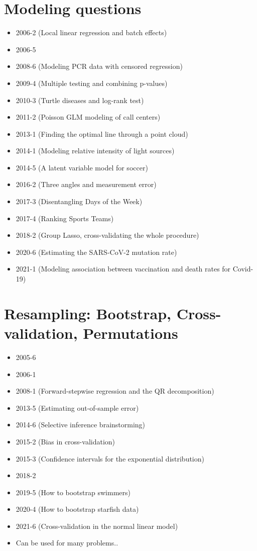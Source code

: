 \documentclass[12pt]{article}
\begin{document}
\section*{Modeling questions}
\begin{itemize}
\item 2006-2 (Local linear regression and batch effects)
\item 2006-5
\item 2008-6 (Modeling PCR data with censored regression)
\item 2009-4 (Multiple testing and combining p-values)
\item 2010-3 (Turtle diseases and log-rank test)
\item 2011-2 (Poisson GLM modeling of call centers)
\item 2013-1 (Finding the optimal line through a point cloud)
\item 2014-1 (Modeling relative intensity of light sources)
\item 2014-5 (A latent variable model for soccer)
\item 2016-2 (Three angles and measurement error)
\item 2017-3 (Disentangling Days of the Week)
\item 2017-4 (Ranking Sports Teams)
\item 2018-2 (Group Lasso, cross-validating the whole procedure)
\item 2020-6 (Estimating the SARS-CoV-2 mutation rate)
\item 2021-1 (Modeling association between vaccination and death rates for Covid-19)
\end{itemize}






\section*{Resampling: Bootstrap, Cross-validation, Permutations}
\begin{itemize}
\item 2005-6
\item 2006-1
\item 2008-1 (Forward-stepwise regression and the QR decomposition)
\item 2013-5 (Estimating out-of-sample error)
\item 2014-6 (Selective inference brainstorming)
\item 2015-2 (Bias in cross-validation)
\item 2015-3 (Confidence intervals for the exponential distribution)
\item 2018-2
\item 2019-5 (How to bootstrap swimmers) 
\item 2020-4 (How to bootstrap starfish data)
\item 2021-6 (Cross-validation in the normal linear model)
\item Can be used for many problems..
\end{itemize}
\end{document}
